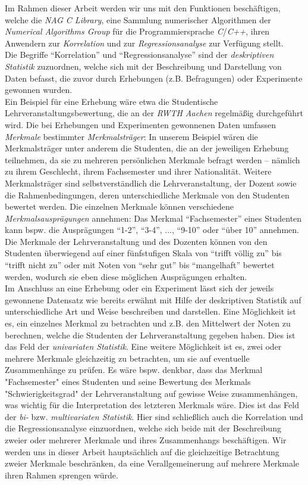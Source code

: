 \documentclass{article}
\begin{document}
Im Rahmen dieser Arbeit werden wir uns mit den Funktionen beschäftigen, welche die {\it NAG C Library}, eine Sammlung numerischer Algorithmen der {\it Numerical Algorithms Group} für die Programmiersprache {\it C}/{\it C++}, ihren Anwendern zur {\it Korrelation} und zur {\it Regressionsanalyse} zur Verfügung stellt.\\
Die Begriffe "`Korrelation"' und "`Regressionsanalyse"' sind der {\it deskriptiven Statistik} zuzuordnen, welche sich mit der Beschreibung und Darstellung von Daten befasst, die zuvor durch Erhebungen (z.B. Befragungen) oder Experimente gewonnen wurden.\\
Ein Beispiel für eine Erhebung wäre etwa die Studentische Lehrveranstaltungsbewertung, die an der {\it RWTH Aachen} regelmäßig durchgeführt wird. Die bei Erhebungen und Experimenten gewonnenen Daten umfassen {\it Merkmale} bestimmter {\it Merkmalsträger}: In unserem Beispiel wären die Merkmalsträger unter anderem die Studenten, die an der jeweiligen Erhebung teilnehmen, da sie zu mehreren persönlichen Merkmale befragt werden -- nämlich zu ihrem Geschlecht, ihrem Fachsemester und ihrer Nationalität. Weitere Merkmalsträger sind selbstverständlich die Lehrveranstaltung, der Dozent sowie die Rahmenbedingungen, deren unterschiedliche Merkmale von den Studenten bewertet werden. Die einzelnen Merkmale können verschiedene {\it Merkmalsausprägungen} annehmen: Das Merkmal "`Fachsemester"' eines Studenten kann bspw. die Ausprägungen "`1-2"', "`3-4"', ..., "`9-10"' oder "`über 10"' annehmen. Die Merkmale der Lehrveranstaltung und des Dozenten können von den Studenten überwiegend auf einer fünfstufigen Skala von "`trifft völlig zu"' bis "`trifft nicht zu"' oder mit Noten von "`sehr gut"' bis "`mangelhaft"' bewertet werden, wodurch sie eben diese möglichen Ausprägungen erhalten.\\
Im Anschluss an eine Erhebung oder ein Experiment lässt sich  der jeweils gewonnene Datensatz wie bereits erwähnt mit Hilfe der deskriptiven Statistik auf unterschiedliche Art und Weise beschreiben und darstellen. Eine Möglichkeit ist es, ein einzelnes Merkmal zu betrachten und z.B. den Mittelwert der Noten zu berechnen, welche die Studenten der Lehrveranstaltung gegeben haben. Dies ist das Feld der {\it univariaten Statistik}. Eine weitere Möglichkeit ist es, zwei oder mehrere Merkmale gleichzeitig zu betrachten, um sie auf eventuelle Zusammenhänge zu prüfen. Es wäre bspw. denkbar, dass das Merkmal "Fachsemester" eines Studenten und seine Bewertung des Merkmals "Schwierigkeitsgrad" der Lehrveranstaltung auf gewisse Weise zusammenhängen, was wichtig für die Interpretation des letzteren Merkmals wäre. Dies ist das Feld der {\it bi-} bzw. {\it multivariaten Statistik}. Hier sind schließlich auch die Korrelation und die Regressionsanalyse einzuordnen, welche sich beide mit der Beschreibung zweier oder mehrerer Merkmale und ihres Zusammenhangs beschäftigen. Wir werden uns in dieser Arbeit hauptsächlich auf die gleichzeitige Betrachtung zweier Merkmale beschränken, da eine Verallgemeinerung auf mehrere Merkmale ihren Rahmen sprengen würde.
\end{document}
